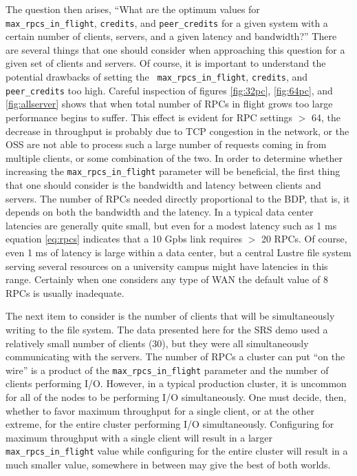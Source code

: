 \documentclass[]{sig-alternate}
\begin{document}
The question then arises, ``What are the optimum values for {\tt max\_rpcs\_in\_flight}, {\tt credits}, and
{\tt peer\_credits} for a given system with a certain number of clients, servers, and a given latency and
bandwidth?'' There are several things that one should consider when approaching this question for a given set
of clients and servers. Of course, it is important to understand the potential drawbacks of setting the {\tt
  max\_rpcs\_in\_flight}, {\tt credits}, and {\tt peer\_credits} too high. Careful inspection of figures
\ref{fig:32pc}, \ref{fig:64pc}, and \ref{fig:allserver} shows that when total number of RPCs in flight grows
too large performance begins to suffer. This effect is evident for RPC settings $>$ 64, the decrease in
throughput is probably due to TCP congestion in the network, or the OSS are not able to process such a large
number of requests coming in from multiple clients, or some combination of the two. In order to determine
whether increasing the {\tt max\_rpcs\_in\_flight} parameter will be beneficial, the first thing that one
should consider is the bandwidth and latency between clients and servers. The number of RPCs needed directly
proportional to the BDP, that is, it depends on both the bandwidth and the latency. In a typical data center
latencies are generally quite small, but even for a modest latency such as 1 ms equation \ref{eq:rpcs}
indicates that a 10 Gpbs link requires $>$ 20 RPCs. Of course, even 1 ms of latency is large within a data
center, but a central Lustre file system serving several resources on a university campus might have latencies
in this range. Certainly when one considers any type of WAN the default value of 8 RPCs is usually inadequate.

The next item to consider is the number of clients that will be simultaneously writing to the file system. The
data presented here for the SRS demo used a relatively small number of clients (30), but they were all
simultaneously communicating with the servers. The number of RPCs a cluster can put ``on the wire'' is a
product of the {\tt max\_rpcs\_in\_flight} parameter and the number of clients performing I/O. However, in a
typical production cluster, it is uncommon for all of the nodes to be performing I/O simultaneously.  One must
decide, then, whether to favor maximum throughput for a single client, or at the other extreme, for the entire
cluster performing I/O simultaneously. Configuring for maximum throughput with a single client will result in
a larger {\tt max\_rpcs\_in\_flight} value while configuring for the entire cluster will result in a much
smaller value, somewhere in between may give the best of both worlds.
\end{document}
